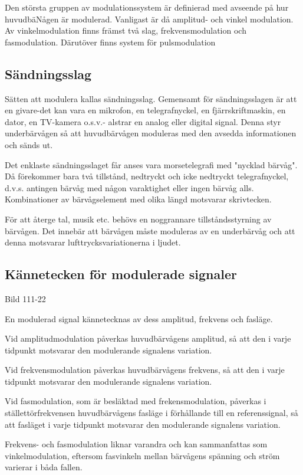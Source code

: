 \documentclass[a4paper,twoside,twocolumn,openright]{book}
\begin{document}
Den största gruppen av modulationssystem är definierad med avseende på hur huvudbäNågen är
modulerad. Vanligast är då amplitud- och vinkel modulation. Av vinkelmodulation finns
främst två slag, frekvensmodulation och fasmodulation. Därutöver finns system för
pulsmodulation

\subsection{Sändningsslag}

Sätten att modulera kallas sändningsslag. Gemensamt för sändningsslagen är att en
givare-det kan vara en mikrofon, en telegrafnyckel, en fjärrskriftmaskin, en dator, en
TV-kamera o.s.v.- alstrar en analog eller digital signal. Denna styr underbärvågen så att
huvudbärvågen moduleras med den avsedda informationen och sänds ut.

Det enklaste sändningsslaget får anses vara morsetelegrafi med "nycklad bärvåg".
Då förekommer bara två tillstånd, nedtryckt och icke nedtryckt telegrafnyckel, d.v.s.
antingen bärvåg med någon varaktighet eller ingen bärvåg alls. Kombinationer av
bärvågselement med olika längd motsvarar skrivtecken.

För att återge tal, musik etc. behövs en noggrannare tillståndsstyrning av bärvågen.
Det innebär att bärvågen måste moduleras av en underbärvåg och att denna motsvarar
lufttrycksvariationerna i ljudet.

\subsection{Kännetecken för modulerade signaler}

Bild 111-22

En modulerad signal kännetecknas av dess amplitud, frekvens och fasläge.

Vid amplitudmodulation påverkas huvudbärvågens amplitud, så att den i varje tidpunkt
motsvarar den modulerande signalens variation.

Vid frekvensmodulation påverkas huvudbärvågens frekvens, så att den i varje tidpunkt
motsvarar den modulerande signalens variation.

Vid fasmodulation, som är besläktad med frekensmodulation, påverkas i ställettörfrekvensen
huvudbärvågens fasläge i förhållande till en referenssignal, så att fasläget i varje
tidpunkt motsvarar den modulerande signalens variation.

Frekvens- och fasmodulation liknar varandra och kan sammanfattas som vinkelmodulation,
eftersom fasvinkeln mellan bärvågens spänning och ström varierar i båda fallen.
\end{document}
